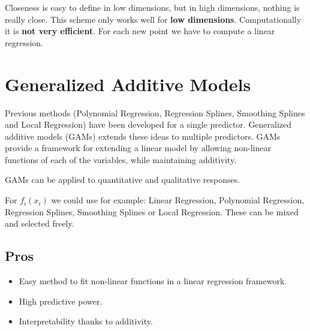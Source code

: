 \documentclass[../Main.tex]{subfiles}
\begin{document}
Closeness is easy to define in low dimensions, but in high dimensions,
nothing is really close. This scheme only works well for \textbf{low dimensions}.
Computationally it is \textbf{not very efficient}.
For each new point we have to compute a linear regression.

\section{Generalized Additive Models}

Previous methods (Polynomial Regression, Regression Splines, Smoothing Splines and Local Regression) have been 
developed for a single predictor.
Generalized additive models (GAMs) extends these ideas to multiple predictors.
GAMs provide a framework for extending a linear model by allowing non-linear functions of each of 
the variables, while maintaining additivity. 


GAMs can be applied to quantitative and qualitative responses.


For \(f_i(x_i)\) we could use for example: Linear Regression, Polynomial Regression, Regression Splines,
Smoothing Splines or Local Regression. These can be mixed and selected freely.

\subsection{Pros}
\begin{itemize}
    \item Easy method to fit non-linear functions in a linear regression framework.
    \item High predictive power.
    \item Interpretability thanks to additivity.
\end{itemize}
\end{document}
